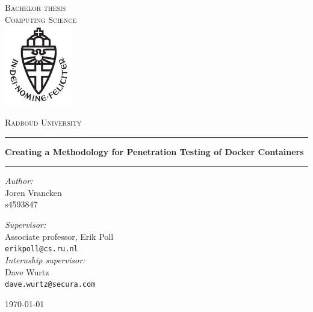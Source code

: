 \documentclass[11pt,a4paper]{report}
\begin{document}
    \hypersetup{pageanchor=false}
    \begin{titlepage}
        \begin{center}
            \textsc{\LARGE Bachelor thesis\\Computing Science}\\[1.5cm]
            \includegraphics[height=100pt]{resources/images/logo}

            \vspace{0.4cm}
            \textsc{\Large Radboud University}\\[1cm]
            \hrule
            \vspace{0.4cm}
            \textbf{\huge Creating a Methodology for Penetration Testing of Docker Containers}\\[0.4cm]
            \hrule
            \vspace{2cm}
            \begin{minipage}[t]{0.45\textwidth}
                \begin{flushleft} \large
                    \textit{Author:}\\
                    Joren Vrancken\\
                    s4593847
                \end{flushleft}
            \end{minipage}
            \begin{minipage}[t]{0.45\textwidth}
                \begin{flushright} \large
                    \textit{Supervisor:}\\
                    Associate professor, Erik Poll\\
                    \texttt{erikpoll@cs.ru.nl}\\[1.3cm]
                    \textit{Internship supervisor:}\\
                    Dave Wurtz\\
                    \texttt{dave.wurtz@secura.com}\\[1.3cm]
                \end{flushright}
            \end{minipage}

            \vfill {\large \today}
            \hfill

        \end{center}
    \end{titlepage}
\end{document}

